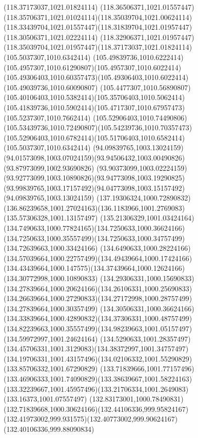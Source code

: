 {{\moveto(118.37173037,1021.01824114)
\curveto(118.36506371,1021.01557447)(118.35706371,1021.01024114)(118.35039704,1021.00624114)
\curveto(118.33439704,1021.01557447)(118.31839704,1021.01957447)(118.30506371,1021.02224114)
\curveto(118.32906371,1021.01957447)(118.35039704,1021.01957447)(118.37173037,1021.01824114)
\moveto(105.5037307,1010.6342414)
\curveto(105.49839736,1010.6222414)(105.4957307,1010.61290807)(105.4957307,1010.6022414)
\curveto(105.49306403,1010.60357473)(105.49306403,1010.6022414)(105.49039736,1010.60090807)
\curveto(105.4477307,1010.56890807)(105.40106403,1010.5382414)(105.35706403,1010.5062414)
\curveto(105.41839736,1010.5902414)(105.4717307,1010.67957473)(105.5237307,1010.7662414)
\curveto(105.52906403,1010.74490806)(105.53439736,1010.72490807)(105.54239736,1010.70357473)
\curveto(105.52906403,1010.6782414)(105.51706403,1010.6582414)(105.5037307,1010.6342414)
\moveto(94.09839765,1003.13024159)
\curveto(94.01573098,1003.07024159)(93.94506432,1003.00490826)(93.87973099,1002.93690826)
\curveto(93.90373099,1003.02224159)(93.92773099,1003.10890826)(93.94773098,1003.19290825)
\curveto(93.99839765,1003.17157492)(94.04773098,1003.15157492)(94.09839765,1003.13024159)
\moveto(137.19306324,1000.72890832)
\curveto(136.86239658,1001.27024163)(136.1183966,1001.2769083)(135.57306328,1001.13157497)
\curveto(135.21306329,1001.03424164)(134.7490633,1000.77824165)(134.7250633,1000.36624166)
\curveto(134.7250633,1000.35557499)(134.7250633,1000.34757499)(134.72639663,1000.33424166)
\curveto(134.6490633,1000.28224166)(134.57039664,1000.22757499)(134.49439664,1000.17424166)
\curveto(134.43439664,1000.147575)(134.37439664,1000.12624166)(134.30772998,1000.10890833)
\curveto(134.29306331,1000.15690833)(134.27839664,1000.20624166)(134.26106331,1000.25690833)
\curveto(134.26639664,1000.27290833)(134.27172998,1000.28757499)(134.27839664,1000.30357499)
\curveto(134.30506331,1000.36624166)(134.33839664,1000.42890832)(134.37306331,1000.48757499)
\curveto(134.82239663,1000.35557499)(134.98239663,1001.05157497)(134.59972997,1001.24624164)
\curveto(134.5290633,1001.28357497)(134.45706331,1001.3129083)(134.38372997,1001.34757497)
\curveto(134.19706331,1001.43157496)(134.02106332,1001.55290829)(133.85706332,1001.67290829)
\curveto(133.71839666,1001.77157496)(133.46906333,1001.74090829)(133.38639667,1001.58224163)
\curveto(133.32239667,1001.45957496)(133.21706334,1001.2649083)(133.16373,1001.07557497)
\curveto(132.83173001,1000.78490831)(132.71839668,1000.30624166)(132.44106336,999.95824167)
\curveto(132.41973002,999.931575)(132.40773002,999.90624167)(132.40106336,999.88090834)
}}
